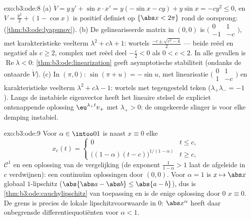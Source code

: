 \begin{solution}{exo:b3:ode:8}
(a) $\dot V = y\,y' + \sin x\cdot x' = y(-\sin x - cy) + y\sin x
= -cy^2 \leq 0$, en $V = \frac{y^2}2 + (1 - \cos x)$ is positief
definiet op $\{\abs x < 2\pi\}$ rond de oorsprong: 
(\cref{thm:b3:ode:lyapunov}).
(b) De gelineariseerde matrix in $(0,0)$ is
$\bigl(\begin{smallmatrix}0 & 1\\ -1 &
-c\end{smallmatrix}\bigr)$, met karakteristieke veelterm
$\lambda^2 + c\lambda + 1$: wortels $\frac{-c \pm \sqrt{c^2 -
4}}2$ --- beide reëel en negatief als $c \geq 2$, complex met
reëel deel $-\frac c2 < 0$ als $0 < c < 2$. In alle gevallen is
$\operatorname{Re}\lambda < 0$:
\cref{thm:b3:ode:linearization} geeft asymptotische stabiliteit
(ondanks de ontaarde $\dot V$).
(c) In $(\pi, 0)$: $\sin(\pi + u) = -\sin u$, met linearisatie
$\bigl(\begin{smallmatrix}0&1\\1&-c\end{smallmatrix}\bigr)$ en
karakteristieke veelterm $\lambda^2 + c\lambda - 1$: wortels met
tegengesteld teken ($\lambda_+\lambda_- = -1$). Langs de
instabiele eigenvector heeft het lineaire stelsel de expliciet
ontsnappende oplossing $\eu^{\lambda_+t}v_+$ met $\lambda_+ > 0$:
de omgekeerde slinger is voor elke demping instabiel.
\end{solution}

\begin{solution}{exo:b3:ode:9}
Voor $\alpha \in \intoo01$ is naast $x \equiv 0$ elke
\[
x_c(t) = \begin{cases}0 & t \leq c,\\
\bigl((1-\alpha)(t - c)\bigr)^{1/(1-\alpha)} & t \geq c,
\end{cases}
\]
$\mathcal C^1$ en een oplossing van de vergelijking (de exponent
$\frac1{1-\alpha} > 1$ laat de afgeleide in $c$ verdwijnen): een
continuüm oplossingen door $(0,0)$. Voor $\alpha = 1$ is $x
\mapsto \abs x$ globaal $1$-lipschitz ($\abs{\abs a - \abs b}
\leq \abs{a - b}$), dus is \cref{thm:b3:ode:cauchylipschitz} van
toepassing en is de enige oplossing door $0$ $x \equiv 0$. De
grens is precies de lokale lipschitzvoorwaarde in $0$: $\abs
x^\alpha$ heeft daar onbegrensde differentiequotiënten voor
$\alpha < 1$.
\end{solution}

